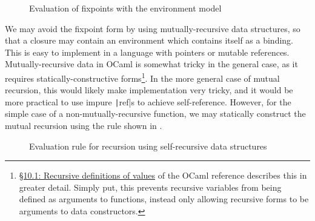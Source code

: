 \begin{figure}
  \centering
  \begin{mdframed}
    \begin{singlespace}
      
    \end{singlespace}
  \end{mdframed}
  \caption{Evaluation of fixpoints with the environment model}
  \label{fig:fixpoint-rules}
\end{figure}

We may avoid the fixpoint form by using mutually-recursive data structures, so that a closure may contain an environment which contains itself as a binding. This is easy to implement in a language with pointers or mutable references. Mutually-recursive data in OCaml is somewhat tricky in the general case, as it requires statically-constructive forms\footnote{\href{https://ocaml.org/manual/letrecvalues.html}{\S10.1: Recursive definitions of values} of the OCaml reference describes this in greater detail. Simply put, this prevents recursive variables from being defined as arguments to functions, instead only allowing recursive forms to be arguments to data constructors.}. In the more general case of mutual recursion, this would likely make implementation very tricky, and it would be more practical to use impure \texttt|ref|s to achieve self-reference. However, for the simple case of a non-mutually-recursive function, we may statically construct the mutual recursion using the rule shown in .

\begin{figure}
  \centering
  \begin{mdframed}
    \begin{singlespace}
      \begin{mathpar}
      \end{mathpar}
    \end{singlespace}
  \end{mdframed}
  \caption{Evaluation rule for recursion using self-recursive data structures}
  \label{fig:rec-closures-let}
\end{figure}


